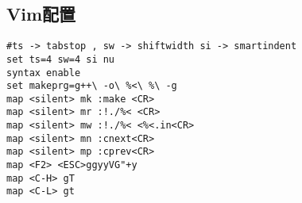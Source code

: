 \subsection{Vim配置}
\begin{verbatim}
#ts -> tabstop , sw -> shiftwidth si -> smartindent
set ts=4 sw=4 si nu
syntax enable
set makeprg=g++\ -o\ %<\ %\ -g
map <silent> mk :make <CR>
map <silent> mr :!./%< <CR>
map <silent> mw :!./%< <%<.in<CR>
map <silent> mn :cnext<CR>
map <silent> mp :cprev<CR>
map <F2> <ESC>ggyyVG"+y
map <C-H> gT
map <C-L> gt
\end{verbatim}

